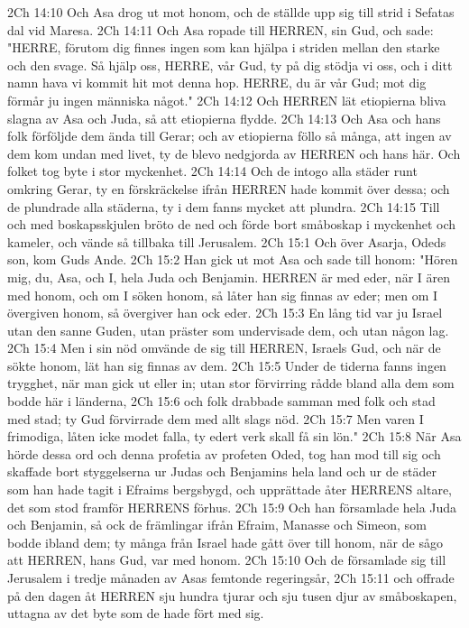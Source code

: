 2Ch 14:10  Och Asa drog ut mot honom, och de ställde upp sig till strid i Sefatas dal vid Maresa.
2Ch 14:11  Och Asa ropade till HERREN, sin Gud, och sade: "HERRE, förutom dig finnes ingen som kan hjälpa i striden mellan den starke och den svage. Så hjälp oss, HERRE, vår Gud, ty på dig stödja vi oss, och i ditt namn hava vi kommit hit mot denna hop. HERRE, du är vår Gud; mot dig förmår ju ingen människa något."
2Ch 14:12  Och HERREN lät etiopierna bliva slagna av Asa och Juda, så att etiopierna flydde.
2Ch 14:13  Och Asa och hans folk förföljde dem ända till Gerar; och av etiopierna föllo så många, att ingen av dem kom undan med livet, ty de blevo nedgjorda av HERREN och hans här. Och folket tog byte i stor myckenhet.
2Ch 14:14  Och de intogo alla städer runt omkring Gerar, ty en förskräckelse ifrån HERREN hade kommit över dessa; och de plundrade alla städerna, ty i dem fanns mycket att plundra.
2Ch 14:15  Till och med boskapsskjulen bröto de ned och förde bort småboskap i myckenhet och kameler, och vände så tillbaka till Jerusalem.
2Ch 15:1  Och över Asarja, Odeds son, kom Guds Ande.
2Ch 15:2  Han gick ut mot Asa och sade till honom: "Hören mig, du, Asa, och I, hela Juda och Benjamin. HERREN är med eder, när I ären med honom, och om I söken honom, så låter han sig finnas av eder; men om I övergiven honom, så övergiver han ock eder.
2Ch 15:3  En lång tid var ju Israel utan den sanne Guden, utan präster som undervisade dem, och utan någon lag.
2Ch 15:4  Men i sin nöd omvände de sig till HERREN, Israels Gud, och när de sökte honom, lät han sig finnas av dem.
2Ch 15:5  Under de tiderna fanns ingen trygghet, när man gick ut eller in; utan stor förvirring rådde bland alla dem som bodde här i länderna,
2Ch 15:6  och folk drabbade samman med folk och stad med stad; ty Gud förvirrade dem med allt slags nöd.
2Ch 15:7  Men varen I frimodiga, låten icke modet falla, ty edert verk skall få sin lön."
2Ch 15:8  När Asa hörde dessa ord och denna profetia av profeten Oded, tog han mod till sig och skaffade bort styggelserna ur Judas och Benjamins hela land och ur de städer som han hade tagit i Efraims bergsbygd, och upprättade åter HERRENS altare, det som stod framför HERRENS förhus.
2Ch 15:9  Och han församlade hela Juda och Benjamin, så ock de främlingar ifrån Efraim, Manasse och Simeon, som bodde ibland dem; ty många från Israel hade gått över till honom, när de sågo att HERREN, hans Gud, var med honom.
2Ch 15:10  Och de församlade sig till Jerusalem i tredje månaden av Asas femtonde regeringsår,
2Ch 15:11  och offrade på den dagen åt HERREN sju hundra tjurar och sju tusen djur av småboskapen, uttagna av det byte som de hade fört med sig.
